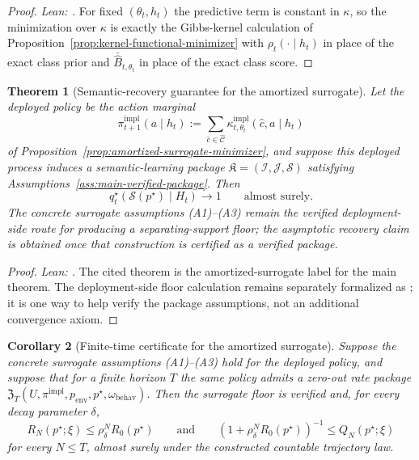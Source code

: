 \documentclass[11pt]{article}
\newtheorem{theorem}{Theorem}[section]
\newtheorem{corollary}[theorem]{Corollary}
\theoremstyle{definition}
\theoremstyle{remark}
\theoremstyle{plain}
\theoremstyle{definition}
\newcommand{\Ccal}{\mathcal{C}}
\newcommand{\Scal}{\mathcal{S}}
\begin{document}
\begin{proof}
\noindent\emph{Lean: .}
For fixed $(\theta_t,h_t)$ the predictive term is constant in $\kappa$, so the minimization over $\kappa$ is exactly the Gibbs-kernel calculation of Proposition~\ref{prop:kernel-functional-minimizer} with $\rho_t(\cdot\mid h_t)$ in place of the exact class prior and $\bar{\widehat B}_{t,\theta_t}$ in place of the exact class score.
\end{proof}

\begin{theorem}[Semantic-recovery guarantee for the amortized surrogate]
\label{thm:amortized-surrogate}
Let the deployed policy be the action marginal
\[
\pi_{t+1}^{\mathrm{impl}}(a\mid h_t)
:=
\sum_{\hat c\in\widehat{\Ccal}}
\kappa_{t,\theta_t}^{\mathrm{impl}}(\hat c,a\mid h_t)
\]
of Proposition~\ref{prop:amortized-surrogate-minimizer}, and suppose this deployed process induces a semantic-learning package $\mathfrak K=(\mathcal I,\mathcal J,\Scal)$ satisfying Assumptions~\ref{ass:main-verified-package}. Then
\[
q_t^\star(\Scal(p^\star)\mid H_t)\longrightarrow 1
\qquad
\text{almost surely.}
\]
The concrete surrogate assumptions \textup{(A1)--(A3)} remain the verified deployment-side route for producing a separating-support floor; the asymptotic recovery claim is obtained once that construction is certified as a verified package.
\end{theorem}

\begin{proof}
\noindent\emph{Lean: .}
The cited theorem is the amortized-surrogate label for the main theorem. The deployment-side floor calculation remains separately formalized as ; it is one way to help verify the package assumptions, not an additional convergence axiom.
\end{proof}


\begin{corollary}[Finite-time certificate for the amortized surrogate]
\label{cor:amortized-surrogate-finite-time}
Suppose the concrete surrogate assumptions \textup{(A1)--(A3)} hold for the deployed policy, and suppose that for a finite horizon $T$ the same policy admits a zero-out rate package $\mathfrak Z_T(U,\pi^{\mathrm{impl}},p_{\mathrm{env}},p^\star,\omega_{\mathrm{behav}})$. Then the surrogate floor is verified and, for every decay parameter $\delta$,
\[
R_N(p^\star;\xi)\le \rho_\delta^N R_0(p^\star)
\qquad\text{and}\qquad
\left(1+\rho_\delta^N R_0(p^\star)\right)^{-1}\le Q_N(p^\star;\xi)
\]
for every $N\le T$, almost surely under the constructed countable trajectory law.
\end{corollary}
\end{document}

